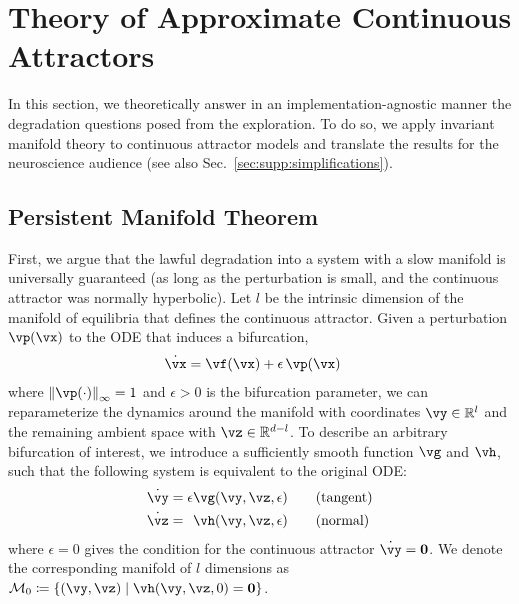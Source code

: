 \documentclass{article} %
\newcounter{ct}
\newcommand{\reals}{\mathbb{R}}
\newcommand{\manifold}{\mathcal{M}}
\newcommand{\uniformNorm}[1]{\left\|#1\right\|_\infty} %
\theoremstyle{definition}
\theoremstyle{remark}
\begin{document}
\section{Theory of Approximate Continuous Attractors}\label{sec:theory}
In this section, we theoretically answer in an implementation-agnostic manner the degradation questions posed from the exploration.
To do so, we apply invariant manifold theory to continuous attractor models and translate the results for the neuroscience audience (see also Sec.~\ref{sec:supp:simplifications}).
\subsection{Persistent Manifold Theorem}\label{sec:imt}
First, we argue that the lawful degradation into a system with a slow manifold is universally guaranteed (as long as the perturbation is small, and the continuous attractor was normally hyperbolic).
Let \(l\) be the intrinsic dimension of the manifold of equilibria that defines the continuous attractor.
Given a perturbation \(\vp(\vx)\) to the ODE that induces a bifurcation,
\begin{align}\label{eq:perturbation:nonparam}
	\dot{\vx} &= \vf(\vx) + \epsilon\,\vp(\vx)
\end{align}where \(\uniformNorm{\vp(\cdot)} = 1\) and \(\epsilon > 0\) is the bifurcation parameter,
we can reparameterize the dynamics around the manifold with coordinates \(\vy \in \reals^{l}\) and the remaining ambient space with \(\vz \in \reals^{d - l}\).
To describe an arbitrary bifurcation of interest, we introduce a sufficiently smooth function \(\vg\) and \(\vh\), such that the following system is equivalent to the original ODE:
\begin{align}
    \dot{\vy} &=           \epsilon  \vg(\vy, \vz, \epsilon) \qquad \text{(tangent)}\label{eq:fenichel:flowtangent}\\
    \dot{\vz} &= \hphantom{\epsilon} \vh(\vy, \vz, \epsilon) \qquad \text{(normal)}\label{eq:fenichel:flownormal}
\end{align}where \(\epsilon = 0\) gives the condition for the continuous attractor \(\dot{\vy} = \mathbf{0}\).
We denote the corresponding manifold of \(l\) dimensions as \(\manifold_{0} \coloneqq \{(\vy,\vz) \mid \vh(\vy,\vz, 0) = \mathbf{0} \}\).
\end{document}
